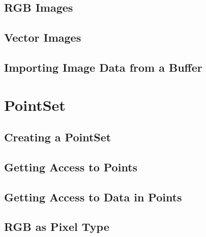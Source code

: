 


\subsection{RGB Images}
\label{sec:DefiningRGBImages}




\subsection{Vector Images}
\label{sec:DefiningVectorImages}




\subsection{Importing Image Data from a Buffer}
\label{sec:ImportingImageDataFromABuffer}




\section{PointSet}
\label{PointSetSection}

\subsection{Creating a PointSet}
\label{sec:CreatingAPointSet}





\subsection{Getting Access to Points}
\label{sec:GettingAccessToPointsInThePointSet}





\subsection{Getting Access to Data in Points}
\label{sec:GettingAccessToDataInThePointSet}





\subsection{RGB as Pixel Type}
\label{sec:PointSetWithRGBAsPixelType}

